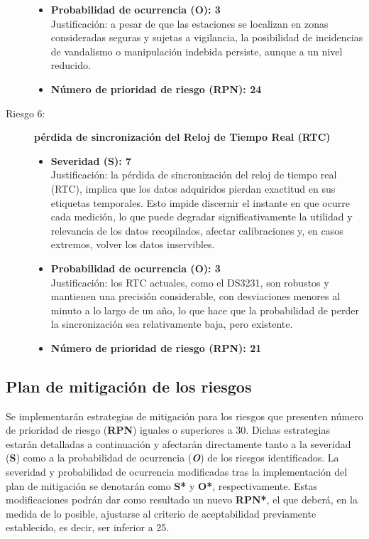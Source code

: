 \begin{description}
\begin{itemize}
		\item \textbf{Probabilidad de ocurrencia (O): 3} \\
		Justificación: a pesar de que las estaciones se localizan en zonas consideradas seguras y sujetas a vigilancia, la posibilidad de incidencias de vandalismo o manipulación indebida persiste, aunque a un nivel reducido.
		
		\item \textbf{Número de prioridad de riesgo (RPN): 24} \\
	\end{itemize}
	
	
	\item[Riesgo 6:] \textbf{pérdida de sincronización del Reloj de Tiempo Real (RTC)}
	\begin{itemize}
		\item \textbf{Severidad (S): 7} \\
		Justificación: la pérdida de sincronización del reloj de tiempo real (RTC), implica que los datos adquiridos pierdan exactitud en sus etiquetas temporales. Esto impide discernir el instante en que ocurre cada medición, lo que puede degradar significativamente la utilidad y relevancia de los datos recopilados, afectar calibraciones y, en casos extremos, volver los datos inservibles.
		
		\item \textbf{Probabilidad de ocurrencia (O): 3} \\
		Justificación: los RTC actuales, como el DS3231, son robustos y mantienen una precisión considerable, con desviaciones menores al minuto a lo largo de un año, lo que hace que la probabilidad de perder la sincronización sea relativamente baja, pero existente.
		
		\item \textbf{Número de prioridad de riesgo (RPN): 21} \\
	\end{itemize}
	
	
	
	
\end{description}


\subsection{Plan de mitigación de los riesgos}

Se implementarán estrategias de mitigación para los riesgos que presenten número de prioridad de riesgo (\textbf{RPN}) iguales o superiores a 30. Dichas estrategias estarán detalladas a continuación y afectarán directamente tanto a la severidad (\textbf{S}) como a la probabilidad de ocurrencia (\textbf{\textit{O}}) de los riesgos identificados. La severidad y probabilidad de ocurrencia modificadas tras la implementación del plan de mitigación se denotarán como \textbf{S*} y \textbf{O*}, respectivamente. Estas modificaciones podrán dar como resultado un nuevo \textbf{RPN*}, el que deberá, en la medida de lo posible, ajustarse al criterio de aceptabilidad previamente establecido, es decir, ser inferior a 25.

